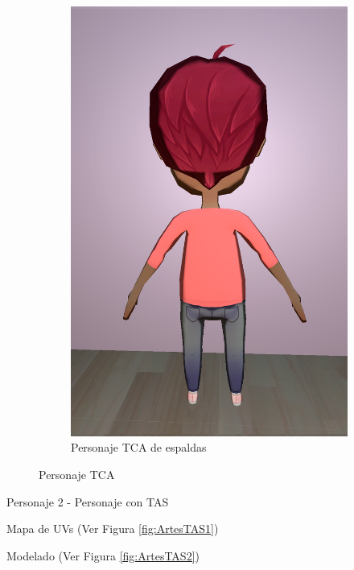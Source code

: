 \documentclass[12pt, a4paper,twoside,titlepage]{book}
\begin{document}
\begin{figure}
\begin{subfigure}{.5\textwidth}
  \includegraphics[width=.95\linewidth]{TGF/Artes/TCA_back.png}
  \caption{Personaje TCA de espaldas}
\end{subfigure}
\caption{Personaje TCA}
\label{fig:ArtesTCA2}
\end{figure}


Personaje 2 - Personaje con TAS
 
 Mapa de UVs (Ver Figura \ref{fig:ArtesTAS1})
 
 Modelado (Ver Figura \ref{fig:ArtesTAS2})
 
\end{document}
